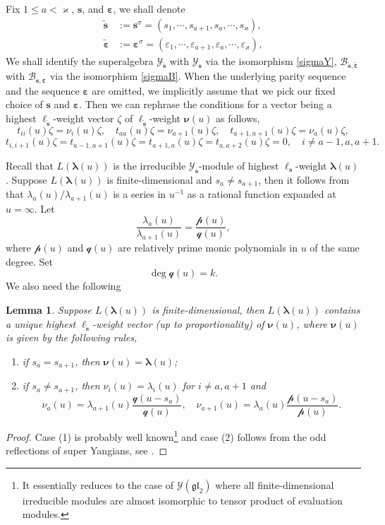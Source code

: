 \documentclass[11pt,reqno]{amsart}
\numberwithin{equation}{section}
\newtheorem{lem}[thm]{Lemma}
\theoremstyle{definition}
\theoremstyle{remark}
\newcommand{\beq}{\begin{equation}}
\newcommand{\eeq}{\end{equation}}
\newcommand{\mc}{\mathcal}
\newcommand{\gl}{\mathfrak{gl}}
\newcommand{\tl}{\tilde}
\newcommand{\lle}{\leqslant}
\newcommand{\la}{\lambda}
\newcommand{\bla}{\bm\lambda}
\newcommand{\YMN}{{\mathscr{Y}_{\bm s}}}
\newcommand{\YMNtl}{{\mathscr{Y}_{\tl{\bm s}}}}
\newcommand{\BMN}{{\mathscr{B}_{\bm s,\bm \ve}}}
\newcommand{\BMNtl}{{\mathscr{B}_{\tl{\bm s},\tl{\bm \ve}}}}
\newcommand{\ka}{\varkappa}
\newcommand{\ve}{\varepsilon}
\newcommand{\s}{{\bm s}}
\begin{document}
Fix $1\lle a<\ka$, $\s$, and $\bm\ve$, we shall denote
\begin{align*}
\tl{\bm s}&:=\s^{\sigma}=(s_1,\cdots,s_{a+1},s_a,\cdots,s_\ka), \\
\tl{\bm \ve}&:=\bm\ve^{\sigma}=(\ve_1,\cdots,\ve_{a+1},\ve_a,\cdots,\ve_\ka),
\end{align*}
We shall identify the superalgebra $\YMNtl$ with $\YMN$ via the isomorphism \eqref{sigmaY}, $\BMNtl$ with $\BMN$ via the isomorphism \eqref{sigmaB}. When the underlying parity sequence and the sequence $\bm\ve$ are omitted, we implicitly assume that we pick our fixed choice of $\s$ and $\bm\ve$. Then we can rephrase the conditions for a vector being a highest $\ell_{\tl{\s}}$-weight vector $\zeta$ of  $\ell_{\tl{\s}}$-weight $\bm\nu(u)$ as follows,
\[
t_{ii}(u)\zeta=\nu_i(u)\zeta,\quad t_{aa}(u)\zeta=\nu_{a+1}(u)\zeta,\quad t_{a+1,a+1}(u)\zeta=\nu_a(u)\zeta,
\]
\[
t_{i,i+1}(u)\zeta=t_{a-1,a+1}(u)\zeta=t_{a+1,a}(u)\zeta=t_{a,a+2}(u)\zeta=0,\quad i\ne a-1,a,a+1.
\]

Recall that $L(\bla(u))$ is the irreducible $\YMN$-module of highest $\ell_\s$-weight $\bla(u)$. Suppose $L(\bla(u))$ is finite-dimensional and $s_a\ne s_{a+1}$, then it follows from \cite{Zhang1995reps} that $\la_a(u)/\la_{a+1}(u)$ is a series in $u^{-1}$ as a rational function expanded at $u=\infty$. Let
\beq\label{pqdef}
\frac{\la_a(u)}{\la_{a+1}(u)}=\frac{\mc p(u)}{\mc q(u)},
\eeq
where $\mc p(u)$ and $\mc q(u)$ are relatively prime monic polynomials in $u$ of the same degree. Set
\beq\label{mcqdeg}
\deg \mc q(u)= k.
\eeq
We also need the following
\begin{lem}\label{lem:ell-weight-ref}
Suppose $L(\bla(u))$ is finite-dimensional, then $L(\bla(u))$ contains a unique highest $\ell_{\tl\s}$-weight vector (up to proportionality) of $\bm\nu(u)$, where $\bm\nu(u)$ is given by the following rules,
\begin{enumerate}
    \item if $s_a=s_{a+1}$, then $\bm\nu(u)=\bla(u)$;
    \item if $s_a\ne s_{a+1}$, then  $\nu_i(u)=\la_i(u)$ for $i\ne a,a+1$ and
    \[
    \nu_a(u)=\la_{a+1}(u)\frac{\mc q(u-s_a)}{\mc q(u)},\quad \nu_{a+1}(u)=\la_{a}(u)\frac{\mc p(u-s_a)}{\mc p(u)}.
    \]
\end{enumerate}
\end{lem}
\begin{proof}
Case (1) is probably well known\footnote{It essentially reduces to the case of $\mathscr Y(\gl_2)$ where all finite-dimensional irreducible modules are almost isomorphic to tensor product of evaluation modules.} and case (2) follows from the odd reflections of super Yangians, see \cite{Molev2022odd,Lu2022note}.
\end{proof}
\end{document}
